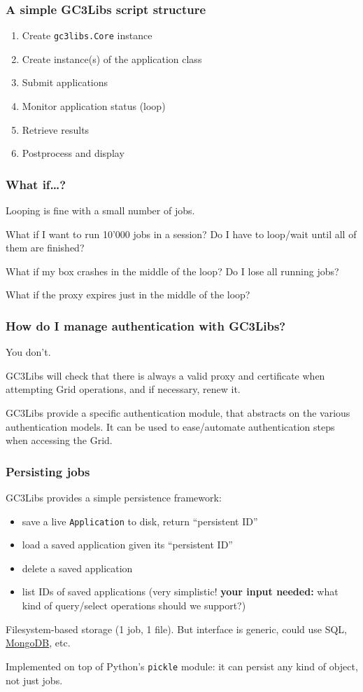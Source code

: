 \documentclass[presentation]{beamer}
\begin{document}
\begin{frame}
\frametitle{A simple GC3Libs script structure}
\label{sec-13}

\begin{enumerate}
\item Create \texttt{gc3libs.Core} instance
\item Create instance(s) of the application class
\item Submit applications
\item Monitor application status (loop)
\item Retrieve results
\item Postprocess and display
\end{enumerate}
\end{frame}
\begin{frame}
\frametitle{What if\ldots{}?}
\label{sec-14}

  Looping is fine with a small number of jobs.

  What if I want to run 10'000 jobs in a session? Do I have to
  loop/wait until all of them are finished?

  What if my box crashes in the middle of the loop?  Do I lose all
  running jobs? 

  What if the proxy expires just in the middle of the loop?
\end{frame}
\begin{frame}
\frametitle{How do I manage authentication with GC3Libs?}
\label{sec-15}

  You don't.

  GC3Libs will check that there is always a valid proxy and
  certificate when attempting Grid operations, and if necessary, renew
  it.  

  GC3Libs provide a specific authentication module, that abstracts on
  the various authentication models.  It can be used to ease/automate
  authentication steps when accessing the Grid.
\end{frame}
\begin{frame}
\frametitle{Persisting jobs}
\label{sec-16}

  GC3Libs provides a simple persistence framework: 
\begin{itemize}
\item save a live \texttt{Application} to disk, return ``persistent ID''
\item load a saved application given its ``persistent ID''
\item delete a saved application
\item list IDs of saved applications (very simplistic! \textbf{your input     needed:} what kind of query/select operations should we support?)
\end{itemize}

  Filesystem-based storage (1 job, 1 file).  But interface is generic,
  could use SQL, \href{http://www.mongodb.org}{MongoDB}, etc.

  Implemented on top of Python's \texttt{pickle} module: it can persist any
  kind of object, not just jobs.
\end{frame}
\end{document}
